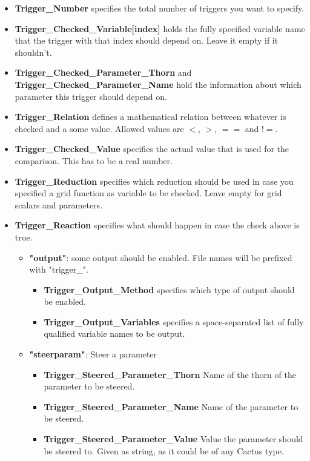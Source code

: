 \begin{itemize}
 \item \textbf{Trigger\_Number} specifies the total number of triggers you want to specify.
 \item \textbf{Trigger\_Checked\_Variable[index]} holds the fully specified variable name that the trigger with that index should depend on. Leave it empty if it shouldn't.
 \item \textbf{Trigger\_Checked\_Parameter\_Thorn} and \textbf{Trigger\_Checked\_Parameter\_Name} hold the information about which parameter this trigger should depend on.
 \item \textbf{Trigger\_Relation} defines a mathematical relation between whatever is checked and a some value. Allowed values are $<$, $>$, $==$ and $!=$.
 \item \textbf{Trigger\_Checked\_Value} specifies the actual value that is used for the comparison. This has to be a real number.
 \item \textbf{Trigger\_Reduction} specifies which reduction should be used in case you specified a grid function as variable to be checked. Leave empty for grid scalars and parameters.
 \item \textbf{Trigger\_Reaction} specifies what should happen in case the check above is true.
  \begin{itemize}
   \item \textbf{"output"}: some output should be enabled. File names will be prefixed with "trigger\_".
    \begin{itemize}
     \item \textbf{Trigger\_Output\_Method} specifies which type of output should be enabled.
     \item \textbf{Trigger\_Output\_Variables} specifies a space-separated list of fully qualified variable names to be output.
    \end{itemize}
   \item \textbf{"steerparam"}: Steer a parameter
    \begin{itemize}
     \item \textbf{Trigger\_Steered\_Parameter\_Thorn} Name of the thorn of the parameter to be steered.
     \item \textbf{Trigger\_Steered\_Parameter\_Name} Name of the parameter to be steered.
     \item \textbf{Trigger\_Steered\_Parameter\_Value} Value the parameter should be steered to. Given as string, as it could be of any Cactus type.
    \end{itemize}

\end{itemize}
\end{itemize}

